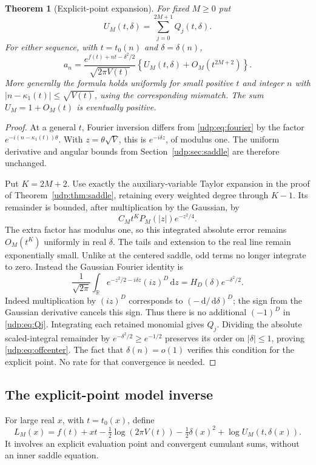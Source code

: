 \documentclass[11pt]{article}
\newtheorem{theorem}{Theorem}[section]
\theoremstyle{remark}\newtheorem{remark}[theorem]{Remark}
\newcommand{\dd}{\,\mathrm d}
\newcommand{\R}{\mathbb R}
\numberwithin{equation}{section}
\begin{document}
\begin{theorem}[Explicit-point expansion]\label{udp:thm:offcenter}
For fixed $M\ge0$ put
\[
 U_M(t,\delta)=\sum_{j=0}^{2M+1}Q_j(t,\delta).
\]
For either sequence, with $t=t_0(n)$ and $\delta=\delta(n)$,
\begin{equation}\label{udp:eq:offcenter}
 a_n=\frac{e^{f(t)+nt-\delta^2/2}}{\sqrt{2\pi V(t)}}
 \left\{U_M(t,\delta)+O_M(t^{2M+2})\right\}.
\end{equation}
More generally the formula holds uniformly for small positive $t$ and integer $n$ with $|n-\kappa_1(t)|\le\sqrt{V(t)}$, using the corresponding mismatch. The sum $U_M=1+O_M(t)$ is eventually positive.
\end{theorem}
\begin{proof}
At a general $t$, Fourier inversion differs from \eqref{udp:eq:fourier} by the factor $e^{-i(n-\kappa_1(t))\theta}$. With $z=\theta\sqrt V$, this is $e^{-i\delta z}$, of modulus one. The uniform derivative and angular bounds from Section~\ref{udp:sec:saddle} are therefore unchanged.

Put $K=2M+2$. Use exactly the auxiliary-variable Taylor expansion in the proof of Theorem~\ref{udp:thm:saddle}, retaining every weighted degree through $K-1$. Its remainder is bounded, after multiplication by the Gaussian, by
\[
 C_Mt^KP_M(|z|)e^{-z^2/4}.
\]
The extra factor has modulus one, so this integrated absolute error remains $O_M(t^K)$ uniformly in real $\delta$. The tails and extension to the real line remain exponentially small. Unlike at the centered saddle, odd terms no longer integrate to zero. Instead the Gaussian Fourier identity is
\begin{equation}\label{udp:eq:hermitefourier}
 \frac1{\sqrt{2\pi}}\int_\R
 e^{-z^2/2-i\delta z}(iz)^D\dd z
 =H_D(\delta)e^{-\delta^2/2}.
\end{equation}
Indeed multiplication by $(iz)^D$ corresponds to $(-\dd/\dd\delta)^D$; the sign from the Gaussian derivative cancels this sign. Thus there is no additional $(-1)^D$ in \eqref{udp:eq:Qj}. Integrating each retained monomial gives $Q_j$. Dividing the absolute scaled-integral remainder by $e^{-\delta^2/2}\ge e^{-1/2}$ preserves its order on $|\delta|\le1$, proving \eqref{udp:eq:offcenter}. The fact that $\delta(n)=o(1)$ verifies this condition for the explicit point. No rate for that convergence is needed.
\end{proof}

\subsection{The explicit-point model inverse}
For large real $x$, with $t=t_0(x)$, define
\begin{equation}\label{udp:eq:LM}
 L_M(x)=f(t)+xt-\tfrac12\log(2\pi V(t))
       -\tfrac12\delta(x)^2+\log U_M(t,\delta(x)).
\end{equation}
It involves an explicit evaluation point and convergent cumulant sums, without an inner saddle equation.
\end{document}
